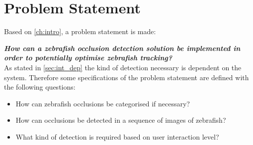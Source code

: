 \chapter{Problem Statement}
Based on \autoref{ch:intro}, a problem statement is made:

\textbf{\textit{How can a zebrafish occlusion detection solution be implemented in order to potentially optimise zebrafish tracking?}}\\

As stated in \autoref{sec:int_dep} the kind of detection necessary is dependent on the system. Therefore some specifications of the problem statement are defined with the following questions:
\begin{itemize}
	\item How can zebrafish occlusions be categorised if necessary?
	\item How can occlusions be detected in a sequence of images of zebrafish? %
	\item What kind of detection is required based on user interaction level?
\end{itemize}


